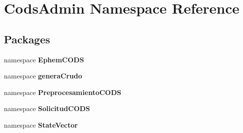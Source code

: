 \section{\-Cods\-Admin \-Namespace \-Reference}
\label{namespace_cods_admin}
\subsection*{\-Packages}
\begin{DoxyCompactItemize}
\item 
namespace {\bf \-Ephem\-C\-O\-D\-S}
\item 
namespace {\bf genera\-Crudo}
\item 
namespace {\bf \-Preprocesamiento\-C\-O\-D\-S}
\item 
namespace {\bf \-Solicitud\-C\-O\-D\-S}
\item 
namespace {\bf \-State\-Vector}
\end{DoxyCompactItemize}
